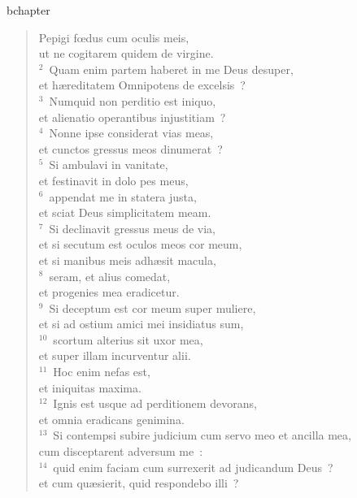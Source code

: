 bchapter\begin{flushleft}\begin{verse}\vspace{-19pt}\hspace{6pt}Pepigi fœdus cum oculis meis,\\\hspace{6pt} ut ne cogitarem quidem de virgine.\\
${}^{2}$~Quam enim partem haberet in me Deus desuper,\\ et h\ae reditatem Omnipotens de excelsis~?\\
${}^{3}$~Numquid non perditio est iniquo,\\ et alienatio operantibus injustitiam~?\\
${}^{4}$~Nonne ipse considerat vias meas,\\ et cunctos gressus meos dinumerat~?\\
${}^{5}$~Si ambulavi in vanitate,\\ et festinavit in dolo pes meus,\\
${}^{6}$~appendat me in statera justa,\\ et sciat Deus simplicitatem meam.\\
${}^{7}$~Si declinavit gressus meus de via,\\ et si secutum est oculos meos cor meum,\\ et si manibus meis adh\ae sit macula,\\
${}^{8}$~seram, et alius comedat,\\ et progenies mea eradicetur.\\
${}^{9}$~Si deceptum est cor meum super muliere,\\ et si ad ostium amici mei insidiatus sum,\\
${}^{10}$~scortum alterius sit uxor mea,\\ et super illam incurventur alii.\\
${}^{11}$~Hoc enim nefas est,\\ et iniquitas maxima.\\
${}^{12}$~Ignis est usque ad perditionem devorans,\\ et omnia eradicans genimina.\\
${}^{13}$~Si contempsi subire judicium cum servo meo et ancilla mea,\\ cum disceptarent adversum me~:\\
${}^{14}$~quid enim faciam cum surrexerit ad judicandum Deus~?\\ et cum qu\ae sierit, quid respondebo illi~?\\

\end{verse}
\end{flushleft}
